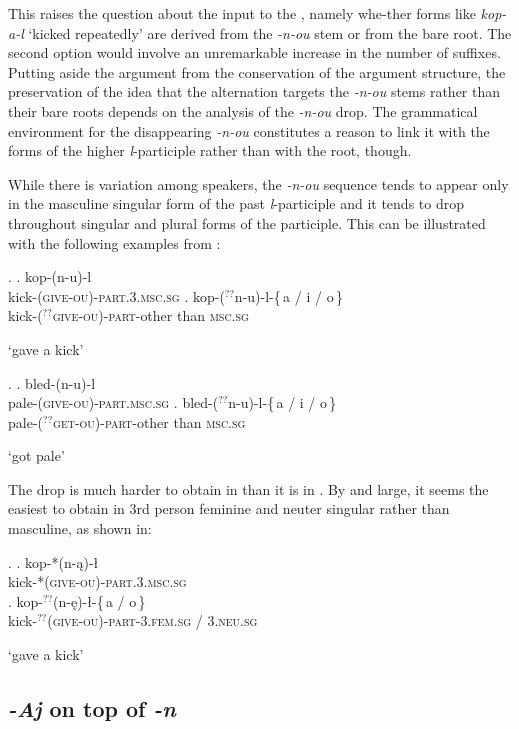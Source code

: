 This raises the question about the input to the , namely whe-ther forms like \textit{kop-a-l} `kicked repeatedly' are derived from the \textit{-n-ou} stem or from the bare root. The second option would involve an unremarkable increase in the number of suffixes. Putting aside the argument from the conservation of the argument structure, the preservation of the idea that 
the alternation targets the \textit{-n-ou} stems rather than their bare roots depends on the analysis of the \textit{-n-ou} drop. The grammatical environment for the disappearing \textit{-n-ou} constitutes a reason to link it with the forms of the higher \textit{l}-participle rather than with the root, though.
\par
While there is variation among  speakers, the \textit{-n-ou} sequence tends to appear only in the masculine singular form of the past \textit{l}-participle and it tends to drop throughout singular and plural forms of the participle. This can be illustrated with the following examples from \cite{LTN}:

\ex.
\a. kop-(n-u)-l \\
kick-\textsc{(give-ou)-part.3.msc.sg}
\bg. kop-($^{??}${n-u)-l}-{\{\,a / i / o\,\}}\\
kick-($^{??}$\textsc{give-ou)-part}-{other than \textsc{msc.sg}}\\
\strut `gave a kick'

\ex.
\a. bled-(n-u)-l \\
pale-\textsc{(give-ou)-part.msc.sg}
\bg. bled-($^{??}$n-u)-l-{\{\,a / i / o\,\}}\\ 
pale-\textsc{($^{??}$get-ou)-part}-other than \textsc{msc.sg}\\
\strut `got pale'

The drop is much harder to obtain in  than it is in . By and large, it seems the easiest to obtain in 3rd person feminine and neuter singular rather than masculine, as shown in:

\ex. 
\ag. kop-*(n-\k{a})-\l{}\\
kick-*\textsc{(give-ou)-part.3.msc.sg}\\
\bg. kop-$^{??}$(n-\k{e})-\l{}-{\{\,a / o\,\}}\\
kick-$^{??}$\textsc{(give-ou)-part-{3.fem.sg / 3.neu.sg}}\\
\strut `gave a kick'

\subsection{\textit{-Aj} on top of \textit{-n}}

